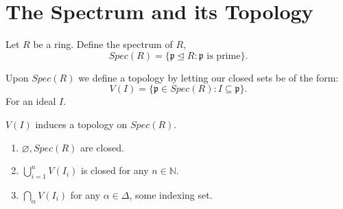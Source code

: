 \documentclass{article}
\theoremstyle{plain}%
\newtheorem[L]{thm}{Theorem}[section]
\newtheorem[L]{lem}[thm]{Lemma}
\newtheorem[L]{prop}[thm]{Proposition}
\theoremstyle{definition}
\newtheorem[M]{defn}{Definition}[section]
\newtheorem[M]{exmp}{Example}[section]
\theoremstyle{remark}
\begin{document}
\section{The Spectrum and its Topology}
\begin{defn}
Let $R$ be a ring. Define the spectrum of $R$,
\[Spec(R)=\{\mathfrak{p}\trianglelefteq R: \mathfrak{p} \text{ is prime}\} .\] 
\end{defn}
\begin{defn}
    Upon $Spec(R)$ we define a topology by letting our closed sets be of the form:
    \[ V(I)=\{\mathfrak{p}\in Spec(R):I\subseteq \mathfrak{p}\} .\] 
    For an ideal $I$.
\end{defn}
\begin{prop}
    $V(I)$ induces a topology on $Spec(R)$.
    \begin{enumerate}
        \item $\varnothing,Spec(R)$ are closed.
        \item $\bigcup_{i=1}^{n}V(I_i)$ is closed for any $n\in \mathbb{N}$.
        \item $\bigcap_{\alpha}^{}V(I_i)$ for any $\alpha\in \Delta$, some indexing set.
    \end{enumerate}
\end{prop}
\end{document}
